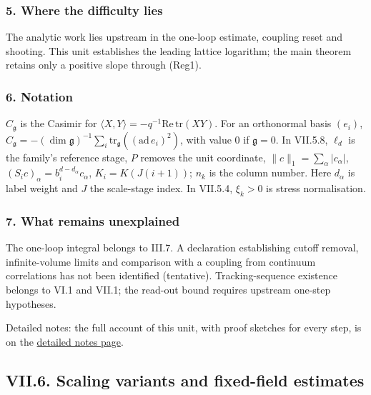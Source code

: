 \documentclass[
  letterpaper,
  11pt]{article}
\begin{document}
\subsubsection{5. Where the difficulty
lies}\label{where-the-difficulty-lies-29}

The analytic work lies upstream in the one-loop estimate, coupling reset
and shooting. This unit establishes the leading lattice logarithm; the
main theorem retains only a positive slope through (Reg1).

\subsubsection{6. Notation}\label{notation-29}

\(C_{\mathfrak g}\) is the Casimir for
\(\langle X,Y\rangle=-q^{-1}\mathrm{Re}\,\mathrm{tr}(XY)\). For an
orthonormal basis \((e_i)\),
\(C_{\mathfrak g}=-(\dim\mathfrak g)^{-1}\sum_i\mathrm{tr}_{\mathfrak g}((\mathrm{ad}\,e_i)^2)\),
with value 0 if \(\mathfrak g=0\). In VII.5.8, \(\ell_d\) is the
family's reference stage, \(P\) removes the unit coordinate,
\(\|c\|_1=\sum_\alpha|c_\alpha|\),
\((S_ic)_\alpha=b_i^{d-d_\alpha}c_\alpha\), \(K_i=K(J(i+1))\); \(n_k\)
is the column number. Here \(d_\alpha\) is label weight and \(J\) the
scale-stage index. In VII.5.4, \(\xi_k>0\) is stress normalisation.

\subsubsection{7. What remains
unexplained}\label{what-remains-unexplained-29}

The one-loop integral belongs to III.7. A declaration establishing
cutoff removal, infinite-volume limits and comparison with a coupling
from continuum correlations has not been identified (tentative).
Tracking-sequence existence belongs to VI.1 and VII.1; the read-out
bound requires upstream one-step hypotheses.

Detailed notes: the full account of this unit, with proof sketches for
every step, is on the
\href{https://github.com/scottnarmstrong/yang-mills-informalization/blob/main/outline/notes/VII-5.md}{detailed
notes page}.

\subsection{VII.6. Scaling variants and fixed-field
estimates}\label{vii.6.-scaling-variants-and-fixed-field-estimates}
\end{document}
